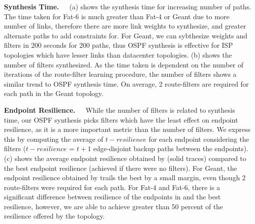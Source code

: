 \noindent\textbf{Synthesis Time.}~~~(a) 
shows the synthesis time for increasing number of paths. 
The time taken for Fat-6 is much greater than Fat-4 or Geant
due to more number of links, therefore there are more link weights
to synthesize, and greater alternate paths to add constraints for. 
For Geant, we can sybthesize weights and filters in 200 seconds 
for 200 paths, thus OSPF synthesis is effective for ISP topologies
which have lesser links than datacenter topologies. 
(b) shows the number of filters synthesized. 
As the time taken is dependent on the number of iterations of
the route-filter learning procedure, the number of filters
shows a similar trend to OSPF synthesis time. On average, 2 route-filters
are required for each path in the Geant topology. 

\noindent\textbf{Endpoint Resilience.}~~~While the number of 
filters is related to synthesis time, our OSPF synthesis picks
filters which have the least effect on endpoint resilience, as it  
is a more important metric than the number of filters. We express this
by computing the average of $t-resilience$ for each endpoint considering
the filters ($t-resilience$ = $t+1$ edge-disjoint backup paths between the 
endpoints).
(c) shows the average
endpoint resilience obtained by \name (solid traces) 
compared to the best endpoint resilience (achieved
if there were no filters). For Geant, the endpoint 
resilience obtained by \name trails the best by a small margin,
even though 2 route-filters were required for each path. For
Fat-4 and Fat-6, there is a significant difference between resilience
of the endpoints in \name and the best resilience, 
however, we are able to achieve greater than
50 percent of the resilience offered by the topology. 

